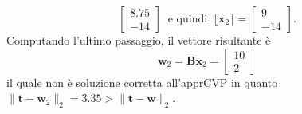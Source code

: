 \begin{exmp}
\[\begin{bmatrix}
        8.75\\
        -14
    \end{bmatrix}
    \ \text{ e quindi } \ \lfloor\mathbf{x}_2\rceil = 
    \begin{bmatrix}
        9\\
        -14
    \end{bmatrix}.
    \]
    Computando l'ultimo passaggio, il vettore risultante è
    \[
        \mathbf{w}_2 = \mathbf{B}\mathbf{x}_2 =
        \begin{bmatrix}
            10\\
            2
        \end{bmatrix}
    \]
    il quale non è soluzione corretta all'apprCVP in quanto 
    $\|\mathbf{t}-\mathbf{w}_2\|_2 = 3.35 > \|\mathbf{t}-\mathbf{w}\|_2$. 
\end{exmp}

